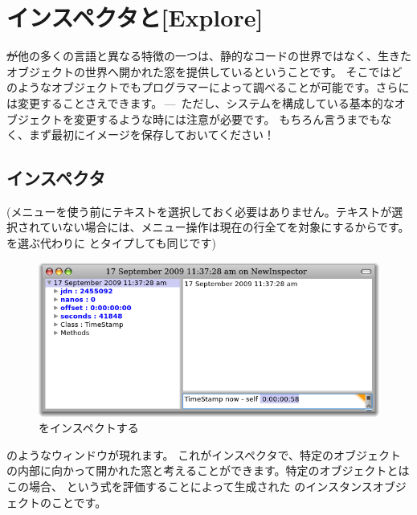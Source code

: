 \documentclass[a4paper,10pt,twoside]{book}
\begin{document}
\section{インスペクタと[Explore]}

\st が他の多くの言語と異なる特徴の一つは、静的なコードの世界ではなく、生きたオブジェクトの世界へ開かれた窓を提供しているということです。
そこではどのようなオブジェクトでもプログラマーによって調べることが可能です。さらには変更することさえできます。\,---\, ただし、システムを構成している基本的なオブジェクトを変更するような時には注意が必要です。
もちろん言うまでもなく、まず最初にイメージを保存しておいてください！

\subsection{インスペクタ}

(メニューを使う前にテキストを選択しておく必要はありません。テキストが選択されていない場合には、メニュー操作は現在の行全てを対象にするからです。
 を選ぶ代わりに  とタイプしても同じです)

\begin{figure}[btp]
\begin{center}
\includegraphics[width=\textwidth]{inspectTimeNow1}
\end{center}
\caption{  をインスペクトする}
\end{figure}

 のようなウィンドウが現れます。
これがインスペクタで、特定のオブジェクトの内部に向かって開かれた窓と考えることができます。特定のオブジェクトとはこの場合、  という式を評価することによって生成された \mbox{} のインスタンスオブジェクトのことです。
\end{document}
